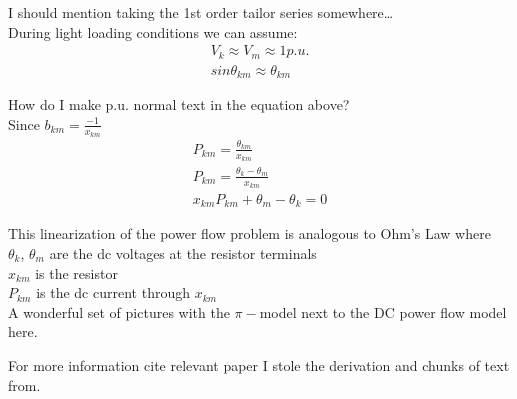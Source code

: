 I should mention taking the 1st order tailor series somewhere\ldots \\
During light loading conditions we can assume:
\begin{eqnarray}
V_k \approx V_m \approx 1 p.u. \\
sin\theta_{km} \approx \theta_{km}
\end{eqnarray}

How do I make p.u. normal text in the equation above? \\

Since $b_{km}=\frac{-1}{x_{km}}$
\begin{eqnarray}
P_{km} = \frac{\theta_{km}}{x_{km}} \\
P_{km} = \frac{\theta_k-\theta_m}{x_{km}} \\
x_{km}P_{km}+\theta_m-\theta_k = 0
\end{eqnarray}

This linearization of the power flow problem is analogous to Ohm's Law where \\
$\theta_k$, $\theta_m$ are the dc voltages at the resistor terminals \\
$x_{km}$ is the resistor \\
$P_{km}$ is the dc current through $x_{km}$ \\

A wonderful set of pictures with the $\pi-$model next to the DC power flow model here.

For more information cite relevant paper I stole the derivation and chunks of text from.
